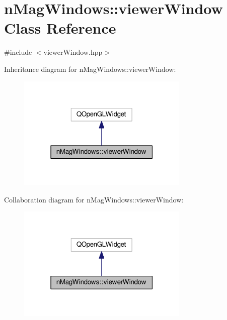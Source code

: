 \hypertarget{classnMagWindows_1_1viewerWindow}{}\section{n\+Mag\+Windows\+:\+:viewer\+Window Class Reference}
\label{classnMagWindows_1_1viewerWindow}


{\ttfamily \#include $<$viewer\+Window.\+hpp$>$}



Inheritance diagram for n\+Mag\+Windows\+:\+:viewer\+Window\+:
\nopagebreak
\begin{figure}[H]
\begin{center}
\leavevmode
\includegraphics[width=231pt]{d0/d95/classnMagWindows_1_1viewerWindow__inherit__graph}
\end{center}
\end{figure}


Collaboration diagram for n\+Mag\+Windows\+:\+:viewer\+Window\+:
\nopagebreak
\begin{figure}[H]
\begin{center}
\leavevmode
\includegraphics[width=231pt]{d8/d51/classnMagWindows_1_1viewerWindow__coll__graph}
\end{center}
\end{figure}
